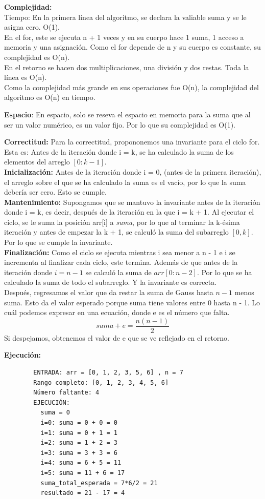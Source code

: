 \documentclass[12pt]{article}
\begin{document}
\begin{itemize}
    \textbf{Complejidad:}\\
    Tiempo: En la primera línea del algoritmo, se declara la valiable suma y se le asigna cero. O(1).\\
    En el for, este se ejecuta n + 1 veces y en su cuerpo hace
    1 suma, 1 acceso a memoria y una asignación.
    Como el for depende de n y su cuerpo es constante, su complejidad es O(n).\\
    En el retorno se hacen dos multiplicaciones, una división y dos restas. Toda la línea es O(n).\\
    Como la complejidad más grande en sus operaciones fue O(n), la complejidad del algoritmo es O(n) en tiempo.

    \textbf{Espacio}: En espacio, solo se reseva el espacio en memoria para la suma que al ser un valor numérico, es un valor fijo. Por lo que su complejidad es O(1).

    \textbf{Correctitud:}
    Para la correctitud, propononemos una invariante para el ciclo for.
    Esta es: Antes de la iteración donde i = k, se ha calculado la suma de los elementos del arreglo $[0:k-1]$.\\
    \textbf{Inicialización:} Antes de la iteración donde i = 0, (antes de la primera iteración), el arreglo sobre el que se ha calculado la suma es el vacío, por lo que la suma debería ser cero. Esto se cumple.\\
    \textbf{Mantenimiento:} Supongamos que se mantuvo la invariante antes de la iteración donde i = k, es decir, después de la iteración en la que i = k + 1. Al ejecutar el ciclo, se le suma la posición arr[i] a \textit{suma}, por lo que al terminar la k-ésima iteración y antes de empezar la k + 1, se calculó la suma del subarreglo $[0, k]$. Por lo que se cumple la invariante.\\
    \textbf{Finalización:} Como el ciclo se ejecuta mientras i sea menor a n - 1 e i se incrementa al finalizar cada ciclo, este termina. Además de que antes de la iteración donde $i = n - 1$ se calculó la suma de $arr[0:n - 2]$. Por lo que se ha calculado la suma de todo el subarreglo.
    Y la invariante es correcta.\\
    Después, regresamos el valor que da restar la suma de Gauss hasta $n - 1$ menos suma. Esto da el valor esperado porque suma tiene valores entre 0 hasta n - 1. Lo cuál podemos expresar en una ecuación, donde e es el número que falta. \[suma + e = \frac{n(n - 1)}{2}\] Si despejamos, obtenemos el valor de e que se ve reflejado en el retorno.

    \textbf{Ejecución:}\\
    \begin{verbatim}
        ENTRADA: arr = [0, 1, 2, 3, 5, 6] , n = 7
        Rango completo: [0, 1, 2, 3, 4, 5, 6]
        Número faltante: 4
        EJECUCIÓN:
          suma = 0
          i=0: suma = 0 + 0 = 0
          i=1: suma = 0 + 1 = 1
          i=2: suma = 1 + 2 = 3
          i=3: suma = 3 + 3 = 6
          i=4: suma = 6 + 5 = 11
          i=5: suma = 11 + 6 = 17
          suma_total_esperada = 7*6/2 = 21
          resultado = 21 - 17 = 4
    \end{verbatim}
\end{itemize}
\end{document}
